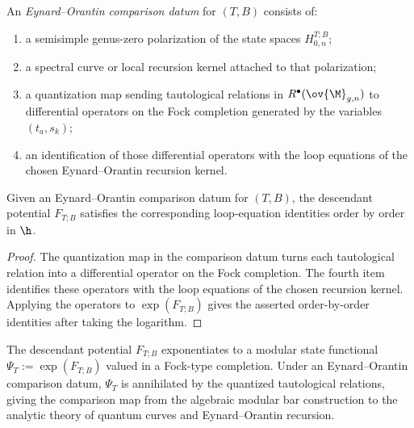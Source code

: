 \begin{definition}
\label{def:eo-comparison-datum}
An \emph{Eynard--Orantin comparison datum} for $(T,B)$ consists of:
\begin{enumerate}[leftmargin=2.4em]
\item a semisimple genus-zero polarization of the state spaces $H_{0,n}^{T;B}$;
\item a spectral curve or local recursion kernel attached to that polarization;
\item a quantization map sending tautological relations in $R^\bullet(\ov{\M}_{g,n})$
to differential operators on the Fock completion generated by the variables
$(t_a,s_k)$;
\item an identification of those differential operators with the loop equations of the
chosen Eynard--Orantin recursion kernel.
\end{enumerate}
\end{definition}

\begin{proposition}
\label{prop:descendant-constraints-from-comparison-datum}
Given an Eynard--Orantin comparison datum for $(T,B)$, the descendant potential
$F_{T;B}$ satisfies the corresponding loop-equation identities order by order in $\h$.
\end{proposition}

\begin{proof}
The quantization map in the comparison datum turns each tautological relation into a
differential operator on the Fock completion. The fourth item identifies these operators
with the loop equations of the chosen recursion kernel. Applying the operators to
$\exp(F_{T;B})$ gives the asserted order-by-order identities after taking the logarithm.
\end{proof}

\begin{remark}
\label{rem:descendant-state-functional}
The descendant potential $F_{T;B}$ exponentiates to a modular state functional
$\Psi_T := \exp(F_{T;B})$ valued in a Fock-type completion. Under an
Eynard--Orantin comparison datum, $\Psi_T$ is annihilated by the quantized tautological
relations, giving the comparison map from the algebraic modular bar construction to the
analytic theory of quantum curves and Eynard--Orantin recursion.
\end{remark}


